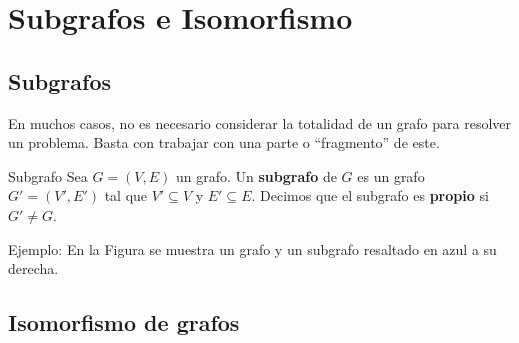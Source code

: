 


\section{Subgrafos e Isomorfismo}

\subsection{Subgrafos}

En muchos casos, no es necesario considerar la totalidad de un grafo para resolver un problema. Basta con trabajar con una parte o ``fragmento'' de este.

\begin{definitionblock}{Subgrafo}
Sea $G = (V, E)$ un grafo. Un \textbf{subgrafo} de $G$ es un grafo $G' = (V', E')$ tal que $V' \subseteq V$ y $E' \subseteq E$. Decimos que el subgrafo es \textbf{propio} si $G' \neq G$.
\end{definitionblock}

\begin{exampleblock}{Ejemplo:}
En la Figura se muestra un grafo y un subgrafo resaltado en azul a su derecha.

\centering

\end{exampleblock}

\subsection{Isomorfismo de grafos}

